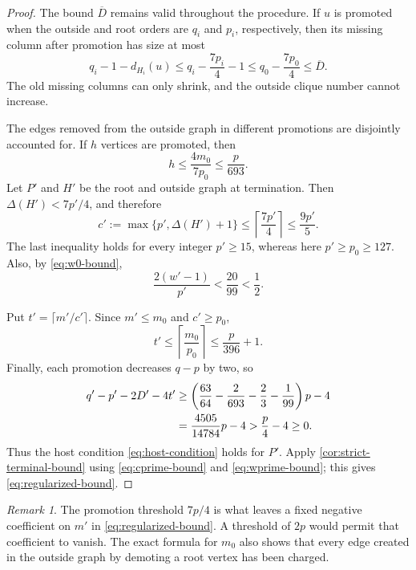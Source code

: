 \documentclass[11pt,reqno]{amsart}
\numberwithin{equation}{section}
\theoremstyle{definition}
\theoremstyle{remark}
\newtheorem{remark}[theorem]{Remark}
\begin{document}
\begin{proof}
The bound $\overline D$ remains valid throughout the procedure.  If $u$ is
promoted when the outside and root orders are $q_i$ and $p_i$, respectively,
then its missing column after promotion has size at most
\[
  q_i-1-d_{H_i}(u)
  \leq q_i-\frac{7p_i}{4}-1
  \leq q_0-\frac{7p_0}{4}\leq\overline D.
\]
The old missing columns can only shrink, and the outside clique number cannot
increase.

The edges removed from the outside graph in different promotions are
disjointly accounted for.  If $h$ vertices are promoted, then
\begin{equation}\label{eq:promotion-count}
  h\leq\frac{4m_0}{7p_0}\leq\frac p{693}.
\end{equation}
Let $P'$ and $H'$ be the root and outside graph at termination.  Then
$\Delta(H')<7p'/4$, and therefore
\begin{equation}\label{eq:cprime-bound}
  c':=\max\{p',\Delta(H')+1\}
  \leq\left\lceil\frac{7p'}4\right\rceil
  \leq\frac{9p'}5.
\end{equation}
The last inequality holds for every integer $p'\geq15$, whereas here
$p'\geq p_0\geq127$.  Also, by \eqref{eq:w0-bound},
\begin{equation}\label{eq:wprime-bound}
  \frac{2(w'-1)}{p'}<\frac{20}{99}<\frac12.
\end{equation}

Put $t'=\lceil m'/c'\rceil$.  Since $m'\leq m_0$ and $c'\geq p_0$,
\begin{equation}\label{eq:tprime-bound}
  t'\leq\left\lceil\frac{m_0}{p_0}\right\rceil
  \leq\frac p{396}+1.
\end{equation}
Finally, each promotion decreases $q-p$ by two, so
\begin{align}
 q'-p'-2D'-4t'
 &\geq
 \left(\frac{63}{64}-\frac2{693}-\frac23-\frac1{99}\right)p-4 \notag\\
 &=\frac{4505}{14784}p-4
  >\frac p4-4\geq0.
 \label{eq:final-host-margin}
\end{align}
Thus the host condition \eqref{eq:host-condition} holds for $P'$.  Apply
\cref{cor:strict-terminal-bound} using \eqref{eq:cprime-bound} and
\eqref{eq:wprime-bound}; this gives \eqref{eq:regularized-bound}.
\end{proof}

\begin{remark}
The promotion threshold $7p/4$ is what leaves a fixed negative coefficient on
$m'$ in \eqref{eq:regularized-bound}.  A threshold of $2p$ would permit that
coefficient to vanish.  The exact formula for $m_0$ also shows that every edge
created in the outside graph by demoting a root vertex has been charged.
\end{remark}
\end{document}
